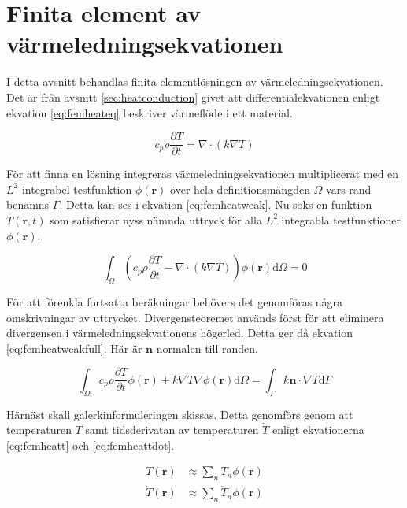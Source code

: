 \section{Finita element av värmeledningsekvationen}
\label{sec:femheat}
I detta avsnitt behandlas finita elementlösningen av värmeledningsekvationen.
Det är från avsnitt \ref{sec:heatconduction} givet att differentialekvationen
enligt ekvation \eqref{eq:femheateq} beskriver värmeflöde i ett material.

\begin{equation}
\label{eq:femheateq}
c_p\rho\frac{\partial T}{\partial t} = \nabla\cdot(k\nabla T)
\end{equation}

\noindent
För att finna en lösning integreras värmeledningsekvationen
multiplicerat med en $L^2$ integrabel testfunktion $\phi(\mathbf{r})$ över hela
definitionsmängden $\Omega$ vars rand benämns $\Gamma$.
Detta kan ses i ekvation \eqref{eq:femheatweak}.
Nu söks en funktion $T(\mathbf{r},t)$ som satisfierar nyss nämnda uttryck för
alla $L^2$ integrabla testfunktioner $\phi(\mathbf{r})$.

\begin{equation}
\label{eq:femheatweak}
\int_\Omega \left(c_p\rho\frac{\partial T}{\partial t} -
\nabla\cdot(k\nabla T)\right)\phi(\mathbf{r})\mathrm{d}\Omega = 0
\end{equation}

\noindent
För att förenkla fortsatta beräkningar behövers det genomföras några
omskrivningar av uttrycket. Divergensteoremet används först för att 
eliminera divergensen i värmeledningsekvationens högerled. Detta ger då
ekvation \eqref{eq:femheatweakfull}. Här är $\mathbf{n}$ normalen till randen.

\begin{equation}
\label{eq:femheatweakfull}
\int_\Omega c_p\rho\frac{\partial T}{\partial t}\phi(\mathbf{r}) +
k\nabla T\nabla\phi(\mathbf{r}) \mathrm{d}\Omega =
\int_\Gamma k\mathbf{n}\cdot\nabla T\mathrm{d}\Gamma
\end{equation}

\noindent
Härnäst skall galerkinformuleringen skissas. Detta genomförs
genom att temperaturen $T$ samt tidsderivatan av temperaturen $\dot{T}$
enligt ekvationerna \eqref{eq:femheatt} och \eqref{eq:femheattdot}.

\begin{align}
\label{eq:femheatt}
T(\mathbf{r}) & \approx \sum_n T_n\phi(\mathbf{r}) \\
\label{eq:femheattdot}
\dot{T}(\mathbf{r}) & \approx \sum_n \dot{T}_n\phi(\mathbf{r})
\end{align}

